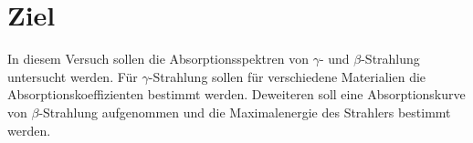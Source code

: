 \section{Ziel}
\label{sec:Ziel}

In diesem Versuch sollen die Absorptionsspektren von $\gamma$- und $\beta$-Strahlung
untersucht werden. Für $\gamma$-Strahlung sollen für verschiedene Materialien die
Absorptionskoeffizienten bestimmt werden. Deweiteren soll eine Absorptionskurve von
$\beta$-Strahlung aufgenommen und die Maximalenergie des Strahlers bestimmt werden.
